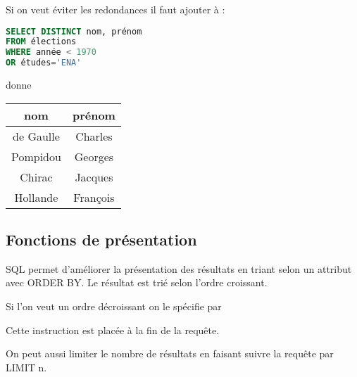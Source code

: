 Si on veut éviter les redondances il faut ajouter  à  :
\begin{lstlisting}[language=SQL]
SELECT DISTINCT nom, prénom
FROM élections
WHERE année < 1970 
OR études='ENA'
\end{lstlisting}
donne
\begin{center}
\begin{tabular}{|c|c|}
\hline
{\bf nom} &{\bf prénom} \\
  \hline
de Gaulle & Charles \\
Pompidou & Georges \\
Chirac &Jacques\\
Hollande &François\\
\hline
\end{tabular}
\end{center}
\subsection{Fonctions de présentation}
SQL permet d'améliorer la présentation des résultats en triant selon un attribut avec ORDER BY.
Le résultat est trié selon l'ordre croissant.

Si l'on veut un ordre décroissant on le spécifie par 

Cette instruction est placée à la fin de la requête.

\medskip

On peut aussi limiter le nombre de résultats en faisant suivre la requête par LIMIT n.
